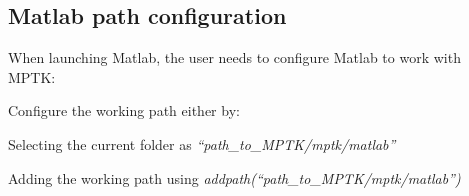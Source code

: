 \subsection{Matlab path configuration}

When launching Matlab, the user needs to configure Matlab to work with MPTK:
\begin{my_itemize}
	\item Configure the working path either by: 
	\begin{my_itemize}
		\item Selecting the current folder as \textcolor[rgb]{0.4,0.4,0.4}{\emph{``path\_to\_MPTK/mptk/matlab''}}
		\item Adding the working path using \textcolor[rgb]{0.4,0.4,0.4}{\emph{addpath(``path\_to\_MPTK/mptk/matlab'')}}
	\end{my_itemize}
\end{my_itemize}
